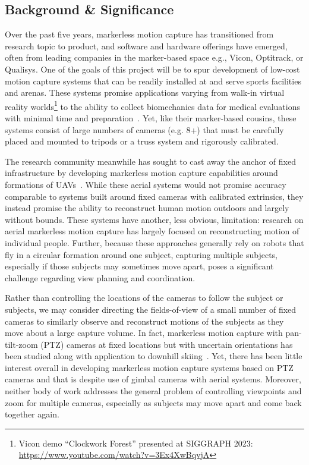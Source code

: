\documentclass[11pt]{article}
\begin{document}
\subsection{Background \& Significance}

Over the past five years, markerless motion capture has transitioned from
research topic to product, and software and hardware offerings have emerged,
often from leading companies in the marker-based space e.g., Vicon, Optitrack,
or Qualisys.
One of the goals of this project will be to spur development of low-cost motion
capture systems that can be readily installed at and serve sports facilities and
arenas.
These systems promise applications varying from walk-in virtual reality
worlds\footnote{%
  Vicon demo ``Clockwork Forest'' presented at SIGGRAPH 2023:
  \url{https://www.youtube.com/watch?v=3Ex4XwBqvjA}
}
to the ability to collect biomechanics data for medical evaluations with minimal
time and preparation~\citep{wade2022peerj}.
Yet, like their marker-based cousins, these systems consist of large numbers of
cameras (e.g. 8+) that must be carefully placed and mounted to tripods or a
truss system and rigorously calibrated.

The research community meanwhile has sought to cast away the anchor of
fixed infrastructure by developing markerless motion capture capabilities around
formations of UAVs~\citep{saini2019iccv,ho2021iros,hong2024eccv,saini2022ral}.
While these aerial systems would not promise accuracy comparable to systems
built around fixed cameras with calibrated extrinsics, they instead promise the
ability to reconstruct human motion outdoors and largely without bounds.
These systems have another, less obvious, limitation: research on aerial
markerless motion capture has largely focused on reconstructing motion of
individual people.
Further, because these approaches generally rely on robots that fly in a
circular formation around one subject, capturing multiple subjects, especially
if those subjects may sometimes move apart, poses a significant challenge
regarding view planning and coordination.

Rather than controlling the locations of the cameras to follow the subject or
subjects, we may consider directing the fields-of-view of a small number of
fixed cameras to similarly observe and reconstruct motions of the subjects as
they move about a large capture volume.
In fact, markerless motion capture with pan-tilt-zoom (PTZ) cameras at fixed
locations but with uncertain orientations has been studied along with
application to downhill skiing~\citep{bachmann20193dv}.
Yet, there has been little interest overall in developing markerless motion
capture systems based on PTZ cameras and that is despite use of gimbal cameras
with aerial systems.
Moreover, neither body of work addresses the general problem of controlling
viewpoints and zoom for multiple cameras, especially as subjects may move apart
and come back together again.
\end{document}
